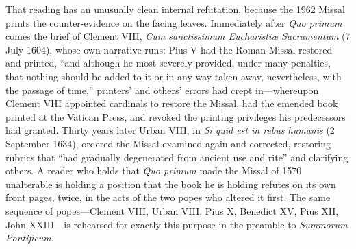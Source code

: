 That reading has an unusually clean internal refutation, because the 1962 Missal prints the counter-evidence on the facing leaves. Immediately after \emph{Quo primum} comes the brief of Clement VIII, \emph{Cum sanctissimum Eucharistiæ Sacramentum} (7 July 1604), whose own narrative runs: Pius V had the Roman Missal restored and printed, ``and although he most severely provided, under many penalties, that nothing should be added to it or in any way taken away, nevertheless, with the passage of time,'' printers' and others' errors had crept in---whereupon Clement VIII appointed cardinals to restore the Missal, had the emended book printed at the Vatican Press, and revoked the printing privileges his predecessors had granted. Thirty years later Urban VIII, in \emph{Si quid est in rebus humanis} (2 September 1634), ordered the Missal examined again and corrected, restoring rubrics that ``had gradually degenerated from ancient use and rite'' and clarifying others. A reader who holds that \emph{Quo primum} made the Missal of 1570 unalterable is holding a position that the book he is holding refutes on its own front pages, twice, in the acts of the two popes who altered it first. The same sequence of popes---Clement VIII, Urban VIII, Pius X, Benedict XV, Pius XII, John XXIII---is rehearsed for exactly this purpose in the preamble to \emph{Summorum Pontificum}.


